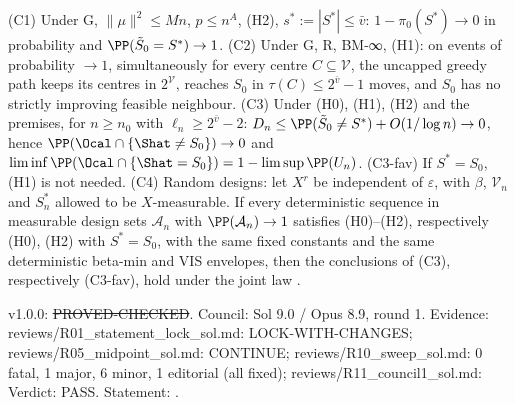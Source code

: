 \begin{theorem}[GEN]\label{reg:W1-GEN_Thm-GEN}
(C1) Under G, $\|\mu\|^2\le Mn$, $p\le n^A$, (H2), $s^*:=|S^*|\le\bar{v}$: $1-\pi_0(S^*)\to0$ in probability and $\PP(\tilde{S}_0=S^*)\to1$. (C2) Under G, R, BM-∞, (H1): on events of probability $\to1$, simultaneously for every centre $C\subseteq\mathcal V$, the uncapped greedy path keeps its centres in $2^{\mathcal V}$, reaches $S_0$ in $\tau(C)\le2^{\bar{v}}-1$ moves, and $S_0$ has no strictly improving feasible neighbour. (C3) Under (H0), (H1), (H2) and the premises, for $n\ge n_0$ with $\ell_n\ge2^{\bar{v}}-2$: $D_n\le\PP(\tilde{S}_0\ne S^*)+O(1/\log n)\to0$, hence $\PP(\Ocal\cap\{\Shat\ne S_0\})\to0$ and $\liminf\PP(\Ocal\cap\{\Shat=S_0\})=1-\limsup\PP(U_n)$. (C3-fav) If $S^*=S_0$, (H1) is not needed. (C4) Random designs: let $X^r$ be independent of $\varepsilon$, with $\beta$, $\mathcal V_n$ and $S_n^*$ allowed to be $X$-measurable. If every deterministic sequence in measurable design sets $\mathcal A_n$ with $\PP(\mathcal A_n)\to1$ satisfies (H0)--(H2), respectively (H0), (H2) with $S^*=S_0$, with the same fixed constants and the same deterministic beta-min and VIS envelopes, then the conclusions of (C3), respectively (C3-fav), hold under the joint law .
\end{theorem}
\begin{statusbox}
 v1.0.0: \st{PROVED-CHECKED}. Council: Sol 9.0 / Opus 8.9, round 1. Evidence: reviews/R01\_statement\_lock\_sol.md: LOCK-WITH-CHANGES; reviews/R05\_midpoint\_sol.md: CONTINUE; reviews/R10\_sweep\_sol.md: 0 fatal, 1 major, 6 minor, 1 editorial (all fixed); reviews/R11\_council1\_sol.md: Verdict: PASS. Statement: .
\end{statusbox}
